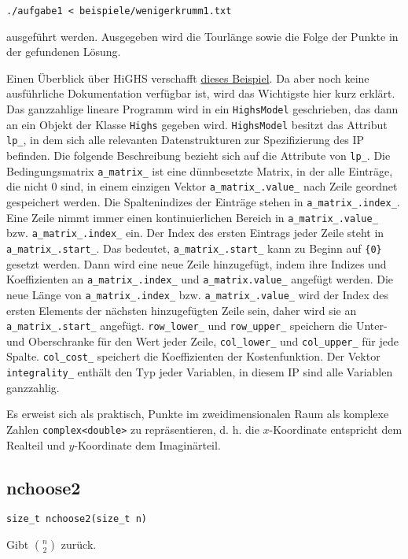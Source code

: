 \documentclass[a4paper, 10pt, ngerman]{article}
\begin{document}
\medskip
\verb|./aufgabe1 < beispiele/wenigerkrumm1.txt|
\medskip

\noindent ausgeführt werden. Ausgegeben wird die Tourlänge sowie die Folge der Punkte in der gefundenen Lösung.

Einen Überblick über HiGHS verschafft \href{https://ergo-code.github.io/HiGHS/cpp/library.html}{dieses Beispiel}. Da aber noch keine ausführliche Dokumentation verfügbar ist, wird das Wichtigste hier kurz erklärt. Das ganzzahlige lineare Programm wird in ein \verb|HighsModel| geschrieben, das dann an ein Objekt der Klasse \verb|Highs| gegeben wird. \verb|HighsModel| besitzt das Attribut \verb|lp_|, in dem sich alle relevanten Datenstrukturen zur Spezifizierung des IP befinden. Die folgende Beschreibung bezieht sich auf die Attribute von \verb|lp_|. Die Bedingungsmatrix \verb|a_matrix_| ist eine dünnbesetzte Matrix, in der alle Einträge, die nicht 0 sind, in einem einzigen Vektor \verb|a_matrix_.value_| nach Zeile geordnet gespeichert werden. Die Spaltenindizes der Einträge stehen in \verb|a_matrix_.index_|. Eine Zeile nimmt immer einen kontinuierlichen Bereich in \verb|a_matrix_.value_| bzw. \verb|a_matrix_.index_| ein. Der Index des ersten Eintrags jeder Zeile steht in \verb|a_matrix_.start_|. Das bedeutet, \verb|a_matrix_.start_| kann zu Beginn auf \verb|{0}| gesetzt werden. Dann wird eine neue Zeile hinzugefügt, indem ihre Indizes und Koeffizienten an \verb|a_matrix_.index_| und \verb|a_matrix.value_| angefügt werden. Die neue Länge von \verb|a_matrix_.index_| bzw. \verb|a_matrix_.value_| wird der Index des ersten Elements der nächsten hinzugefügten Zeile sein, daher wird sie an \verb|a_matrix_.start_| angefügt. \verb|row_lower_| und \verb|row_upper_| speichern die Unter- und Oberschranke für den Wert jeder Zeile, \verb|col_lower_| und \verb|col_upper_| für jede Spalte. \verb|col_cost_| speichert die Koeffizienten der Kostenfunktion. Der Vektor \verb|integrality_| enthält den Typ jeder Variablen, in diesem IP sind alle Variablen ganzzahlig.

Es erweist sich als praktisch, Punkte im zweidimensionalen Raum als komplexe Zahlen \verb|complex<double>| zu repräsentieren, d. h. die $x$-Koordinate entspricht dem Realteil und $y$-Koordinate dem Imaginärteil. 

\subsection{nchoose2}
\verb|size_t nchoose2(size_t n)|
\medskip

\noindent Gibt $\binom n 2$ zurück.
\end{document}
